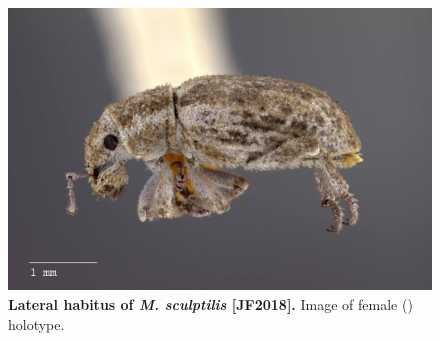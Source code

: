 \documentclass[fleqn,10pt,lineno]{wlpeerj} %
\begin{document}
\begin{figure}[h]
	\begin{sideways}
		\centering
		\includegraphics[height=\textwidth]{sculptilis_F_lateral.jpg}
	\end{sideways}
	\caption{\textbf{Lateral habitus of \textit{M. sculptilis} [JF2018].} Image of female (\female) holotype.}
	\label{fig:sculptilis_F_lateral}
\end{figure}
\end{document}
